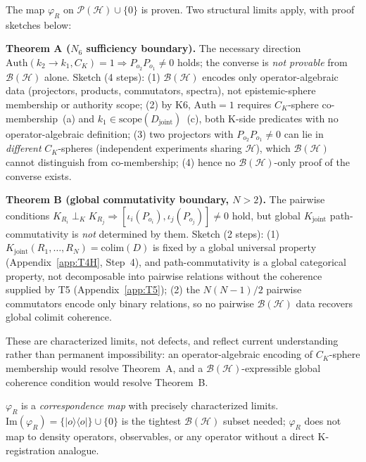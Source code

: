 \documentclass[12pt,a4paper]{article}
\theoremstyle{plain}
\theoremstyle{definition}
\theoremstyle{remark}
\newcommand{\CK}{C_K}
\begin{document}
\begin{tcolorbox}[colback=gray!8,colframe=gray!50,
    title=\textbf{Boundary of restricted existence},fonttitle=\small]
\small
The map $\varphi_R$ on $\mathcal{P}(\mathcal{H})\cup\{0\}$ is proven.
Two structural limits apply, with proof sketches below:

\medskip
\textbf{Theorem A ($N_6$ sufficiency boundary).}
The necessary direction $\mathrm{Auth}(k_2\to k_1,\CK)=1 \Rightarrow
P_{o_2}P_{o_1}\ne 0$ holds; the converse is \emph{not provable} from
$\mathcal{B}(\mathcal{H})$ alone. Sketch (4 steps):
\textup{(1)} $\mathcal{B}(\mathcal{H})$ encodes only operator-algebraic data
(projectors, products, commutators, spectra), not epistemic-sphere membership
or authority scope;
\textup{(2)} by K6, $\mathrm{Auth}=1$ requires $\CK$-sphere co-membership~(a)
and $k_1\in\mathrm{scope}(D_{\mathrm{joint}})$~(c), both K-side predicates with
no operator-algebraic definition;
\textup{(3)} two projectors with $P_{o_2}P_{o_1}\ne 0$ can lie in
\emph{different} $\CK$-spheres (independent experiments sharing $\mathcal{H}$),
which $\mathcal{B}(\mathcal{H})$ cannot distinguish from co-membership;
\textup{(4)} hence no $\mathcal{B}(\mathcal{H})$-only proof of the converse
exists.

\medskip
\textbf{Theorem B (global commutativity boundary, $N>2$).}
The pairwise conditions $K_{R_i}\perp_K K_{R_j}\Rightarrow
[\iota_i(P_{o_i}),\iota_j(P_{o_j})]\ne 0$ hold, but global $K_{\mathrm{joint}}$
path-commutativity is \emph{not} determined by them. Sketch (2 steps):
\textup{(1)} $K_{\mathrm{joint}}(R_1,\ldots,R_N)=\mathrm{colim}(D)$ is fixed by
a global universal property (Appendix~\ref{app:T4H}, Step~4), and
path-commutativity is a global categorical property, not decomposable into
pairwise relations without the coherence supplied by T5
(Appendix~\ref{app:T5});
\textup{(2)} the $N(N-1)/2$ pairwise commutators encode only binary relations,
so no pairwise $\mathcal{B}(\mathcal{H})$ data recovers global colimit
coherence.

\medskip
These are characterized limits, not defects, and reflect current understanding
rather than permanent impossibility: an operator-algebraic encoding of
$\CK$-sphere membership would resolve Theorem~A, and a
$\mathcal{B}(\mathcal{H})$-expressible global coherence condition would resolve
Theorem~B.

\medskip
\noindent
$\varphi_R$ is a \emph{correspondence map} with precisely characterized
limits. $\mathrm{Im}(\varphi_R) = \{|o\rangle\langle o|\} \cup \{0\}$
is the tightest $\mathcal{B}(\mathcal{H})$ subset needed; $\varphi_R$ does
not map to density operators, observables, or any operator without a
direct K-registration analogue.
\end{tcolorbox}
\end{document}
